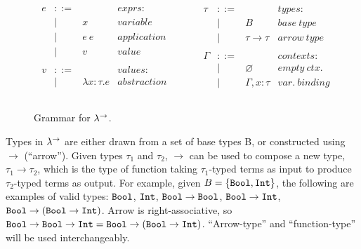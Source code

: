 \begin{figure}[h]
\vspace{-5pt}

\[
\begin{array}{lll}

\begin{array}{lllr}

e & ::= & ~ & exprs: \\
	& | & x & variable \\
	& | & e~e & application \\
	& | & v & value \\
	&&\\
	
v & ::= & ~ & values: \\
	& | & \lambda x: \tau . e & abstraction \\
	&&\\
	
\end{array}

& ~~~~~~ &

\begin{array}{lllr}

\tau & ::= & ~ & types: \\
	& | & B & base~type \\
	& | & \tau \rightarrow \tau & arrow~type \\
	&&\\
	
\Gamma & ::= & ~ & contexts: \\
	& | & \varnothing & empty~ctx. \\
	& | & \Gamma, x: \tau & var.~binding \\
	&&\\
	
\end{array}

\end{array}
\]

\vspace{-7pt}
\caption{Grammar for $\lambda^{\rightarrow}$.}
\label{This is the label.}
\end{figure}

Types in $\lambda^{\rightarrow}$ are either drawn from a set of base types B, or constructed using $\rightarrow$ (``arrow''). Given types $\tau_1$ and $\tau_2$, $\rightarrow$ can be used to compose a new type, $\tau_1 \rightarrow \tau_2$, which is the type of function taking $\tau_1$-typed terms as input to produce $\tau_2$-typed terms as output. For example, given $B = \{ \mathtt{Bool}, \mathtt{Int} \}$, the following are examples of valid types: $\mathtt{Bool}$, $\mathtt{Int}$, $\mathtt{Bool} \rightarrow \mathtt{Bool}$, $\mathtt{Bool} \rightarrow \mathtt{Int}$, $\mathtt{Bool} \rightarrow (\mathtt{Bool} \rightarrow \mathtt{Int})$. Arrow is right-associative, so $\mathtt{Bool} \rightarrow \mathtt{Bool} \rightarrow \mathtt{Int} = \mathtt{Bool} \rightarrow (\mathtt{Bool} \rightarrow \mathtt{Int})$. ``Arrow-type'' and ``function-type'' will be used interchangeably.

